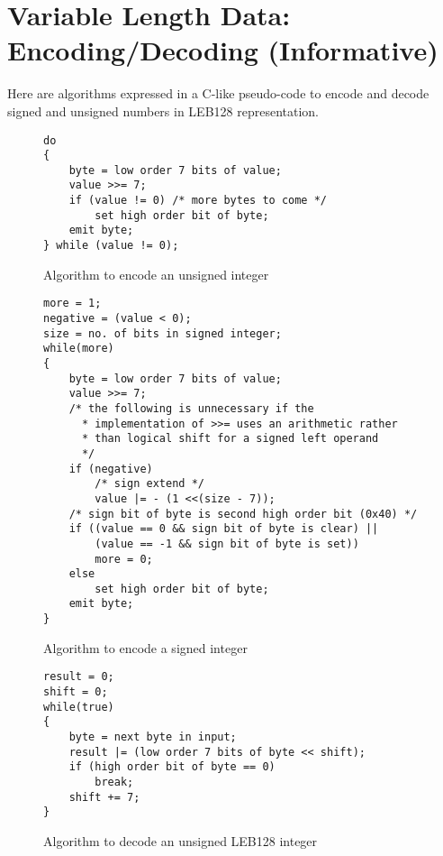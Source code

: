 
\chapter[Encoding/Decoding (Informative)]{Variable Length Data: Encoding/Decoding (Informative)}
\label{app:variablelengthdataencodingdecodinginformative}

Here are algorithms expressed in a C-like pseudo-code to
encode and decode signed and unsigned numbers in LEB128
representation.

\begin{figure}[here]
\caption{Algorithm to encode an unsigned integer}
\begin{lstlisting}
do
{
    byte = low order 7 bits of value;
    value >>= 7;
    if (value != 0) /* more bytes to come */
        set high order bit of byte;
    emit byte;
} while (value != 0);
\end{lstlisting}
\end{figure}


\begin{figure}[here]
\caption{Algorithm to encode a signed integer}
\begin{lstlisting}
more = 1;
negative = (value < 0);
size = no. of bits in signed integer;
while(more)
{
    byte = low order 7 bits of value;
    value >>= 7;
    /* the following is unnecessary if the
      * implementation of >>= uses an arithmetic rather
      * than logical shift for a signed left operand
      */
    if (negative)
        /* sign extend */
        value |= - (1 <<(size - 7));
    /* sign bit of byte is second high order bit (0x40) */
    if ((value == 0 && sign bit of byte is clear) ||
        (value == -1 && sign bit of byte is set))
        more = 0;
    else
        set high order bit of byte;
    emit byte;
}
\end{lstlisting}
\end{figure}




\begin{figure}[here]
\caption{Algorithm to decode an unsigned LEB128 integer}
\begin{lstlisting}
result = 0;
shift = 0;
while(true)
{
    byte = next byte in input;
    result |= (low order 7 bits of byte << shift);
    if (high order bit of byte == 0)
        break;
    shift += 7;
}
\end{lstlisting}
\end{figure}

